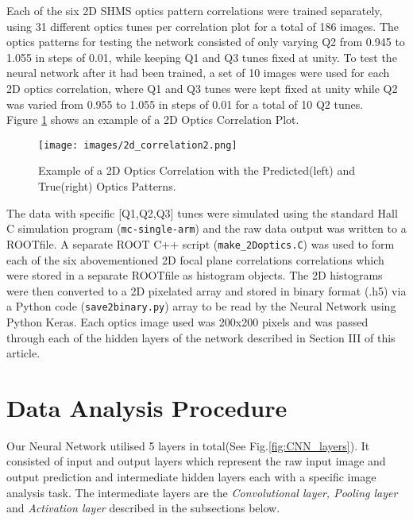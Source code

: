 \documentclass[conference]{IEEEtran}
\begin{document}
Each of the six 2D SHMS optics pattern correlations were trained separately, using 31 different optics tunes
per correlation plot for a total of 186 images. The optics patterns for testing the network consisted of only
varying Q2 from 0.945 to 1.055 in steps of 0.01, while keeping Q1 and Q3 tunes fixed at unity.
To test the neural network after it had been trained, a set of 10 images were used for each 2D optics correlation, where Q1 and Q3
tunes were kept fixed at unity while Q2 was varied from 0.955 to 1.055 in steps of 0.01 for a total of 10 Q2 tunes.\\ Figure \ref{fig:2d_correlation2} shows an example of a 2D Optics Correlation Plot.




\begin{figure}[h]
 \centering
  \texttt{[image: images/2d\_correlation2.png]}
  \caption{Example of a 2D Optics Correlation with the Predicted(left) and True(right) Optics Patterns.}
  \label{fig:2d_correlation2}
\end{figure}

\newcommand{\RNum}[1]{\uppercase\expandafter{\romannumeral #1\relax}}


The data with specific [Q1,Q2,Q3] tunes were simulated using the standard Hall C simulation program (\texttt{mc-single-arm})
and the raw data output was written to a ROOTfile. A separate ROOT C++ script (\texttt{make\_2Doptics.C}) was used to form each of
the six abovementioned 2D focal plane correlations correlations which were stored in a separate ROOTfile as histogram objects.
The 2D histograms were then converted to a 2D pixelated array and stored in binary format (.h5) via a Python code (\texttt{save2binary.py})
array to be read by the Neural Network using Python Keras. Each optics image used was 200x200 pixels and was passed through each of
the hidden layers of the network described in Section III of this article.




\section{Data Analysis Procedure}



\indent Our Neural Network utilised 5 layers in total(See Fig.\ref{fig:CNN_layers}). It consisted of input and output layers which represent the raw input image and output prediction and intermediate hidden layers each with a specific image analysis task. The intermediate layers are the \emph{Convolutional layer, Pooling layer} and \emph{Activation layer} described in the subsections below.\\
\end{document}
